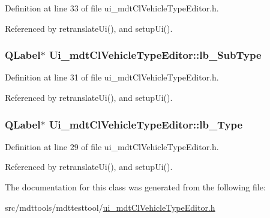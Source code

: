 Definition at line 33 of file ui\-\_\-mdt\-Cl\-Vehicle\-Type\-Editor.\-h.



Referenced by retranslate\-Ui(), and setup\-Ui().

\hypertarget{class_ui__mdt_cl_vehicle_type_editor_a4b29f6b96b25437af600143665f6c348}{
\subsubsection[{lb\-\_\-\-Sub\-Type}]{\setlength{\rightskip}{0pt plus 5cm}Q\-Label$\ast$ Ui\-\_\-mdt\-Cl\-Vehicle\-Type\-Editor\-::lb\-\_\-\-Sub\-Type}}\label{class_ui__mdt_cl_vehicle_type_editor_a4b29f6b96b25437af600143665f6c348}


Definition at line 31 of file ui\-\_\-mdt\-Cl\-Vehicle\-Type\-Editor.\-h.



Referenced by retranslate\-Ui(), and setup\-Ui().

\hypertarget{class_ui__mdt_cl_vehicle_type_editor_a8dda7a0d2d6d159de24132e51875379c}{
\subsubsection[{lb\-\_\-\-Type}]{\setlength{\rightskip}{0pt plus 5cm}Q\-Label$\ast$ Ui\-\_\-mdt\-Cl\-Vehicle\-Type\-Editor\-::lb\-\_\-\-Type}}\label{class_ui__mdt_cl_vehicle_type_editor_a8dda7a0d2d6d159de24132e51875379c}


Definition at line 29 of file ui\-\_\-mdt\-Cl\-Vehicle\-Type\-Editor.\-h.



Referenced by retranslate\-Ui(), and setup\-Ui().



The documentation for this class was generated from the following file\-:\begin{DoxyCompactItemize}
\item 
src/mdttools/mdttesttool/\hyperlink{ui__mdt_cl_vehicle_type_editor_8h}{ui\-\_\-mdt\-Cl\-Vehicle\-Type\-Editor.\-h}\end{DoxyCompactItemize}
